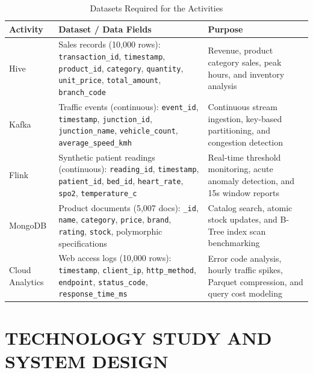 \documentclass[12pt,a4paper]{report}
\begin{document}
\begin{table}[H]
\centering
\small
\caption{Datasets Required for the Activities}
\label{tab:datasets_reqs}
\begin{tabularx}{\textwidth}{|>{\raggedright\arraybackslash}p{2.5cm}|>{\raggedright\arraybackslash}p{6.5cm}|>{\raggedright\arraybackslash}X|}
\hline
\textbf{Activity} & \textbf{Dataset / Data Fields} & \textbf{Purpose}\\
\hline
Hive & Sales records (10,000 rows): \texttt{transaction\_id}, \texttt{timestamp}, \texttt{product\_id}, \texttt{category}, \texttt{quantity}, \texttt{unit\_price}, \texttt{total\_amount}, \texttt{branch\_code} & Revenue, product category sales, peak hours, and inventory analysis\\
\hline
Kafka & Traffic events (continuous): \texttt{event\_id}, \texttt{timestamp}, \texttt{junction\_id}, \texttt{junction\_name}, \texttt{vehicle\_count}, \texttt{average\_speed\_kmh} & Continuous stream ingestion, key-based partitioning, and congestion detection\\
\hline
Flink & Synthetic patient readings (continuous): \texttt{reading\_id}, \texttt{timestamp}, \texttt{patient\_id}, \texttt{bed\_id}, \texttt{heart\_rate}, \texttt{spo2}, \texttt{temperature\_c} & Real-time threshold monitoring, acute anomaly detection, and 15s window reports\\
\hline
MongoDB & Product documents (5,007 docs): \texttt{\_id}, \texttt{name}, \texttt{category}, \texttt{price}, \texttt{brand}, \texttt{rating}, \texttt{stock}, polymorphic specifications & Catalog search, atomic stock updates, and B-Tree index scan benchmarking\\
\hline
Cloud Analytics & Web access logs (10,000 rows): \texttt{timestamp}, \texttt{client\_ip}, \texttt{http\_method}, \texttt{endpoint}, \texttt{status\_code}, \texttt{response\_time\_ms} & Error code analysis, hourly traffic spikes, Parquet compression, and query cost modeling\\
\hline
\end{tabularx}
\end{table}

\clearpage

\chapter{TECHNOLOGY STUDY AND SYSTEM DESIGN}
\end{document}
